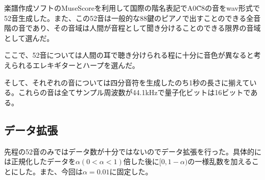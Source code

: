 楽譜作成ソフトのMuseScoreを利用して国際の階名表記でA0\~C8の音をwav形式で52音生成した。また、この52音は一般的な88鍵のピアノで出すことのできる全音階の音であり、その音域は人間が音程として聞き分けることのできる限界の音域として選んだ。\par
ここで、52音については人間の耳で聴き分けられる程に十分に音色が異なると考えられるエレキギターとハープを選んだ。\par
そして、それぞれの音については四分音符を生成したのち1秒の長さに揃えている。これらの音は全てサンプル周波数が44.1kHzで量子化ビットは16ビットである。

\subsection{データ拡張}
先程の52音のみではデータ数が十分ではないのでデータ拡張を行った。具体的には正規化したデータを$\alpha(0 < \alpha <1)$倍した後に$[0,1-\alpha)$の一様乱数を加えることにした。また、今回は$\alpha=0.01$に固定した。


